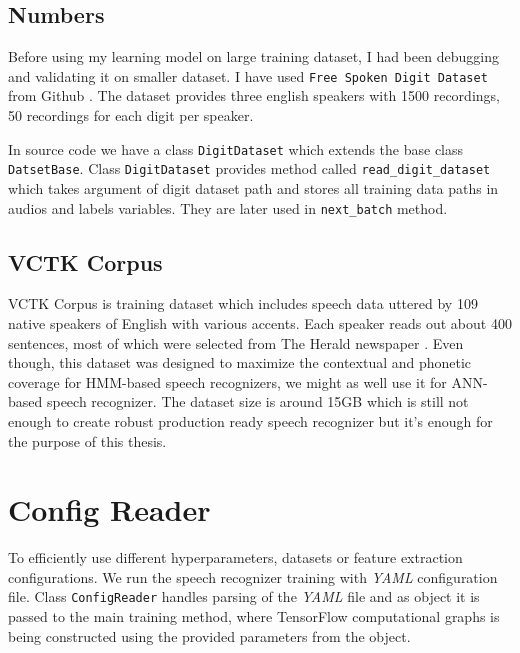 \subsection{Numbers}

Before using my learning model on large training dataset, I had been debugging and validating it on smaller dataset.
I have used \texttt{Free Spoken Digit Dataset} from Github \cite{audio_dataset}.
The dataset provides three english speakers with 1500 recordings, 50 recordings for each digit per speaker.

In source code we have a class \texttt{DigitDataset} which extends the base class \texttt{DatsetBase}.
Class \texttt{DigitDataset} provides method called \texttt{read\_digit\_dataset} which takes argument of digit dataset path and stores all training data paths in audios and labels variables.
They are later used in \texttt{next\_batch} method.

\subsection{VCTK Corpus}

VCTK Corpus is training dataset which includes speech data uttered by 109 native speakers of English with various accents.
Each speaker reads out about 400 sentences, most of which were selected from The Herald newspaper \cite{vctk}.
Even though, this dataset was designed to maximize the contextual and phonetic coverage for HMM-based speech recognizers, we might as well use it for ANN-based speech recognizer.
The dataset size is around 15GB which is still not enough to create robust production ready speech recognizer but it's enough for the purpose of this thesis.

\section{Config Reader}

To efficiently use different hyperparameters, datasets or feature extraction configurations.
We run the speech recognizer training with \textit{YAML} configuration file.
Class \texttt{ConfigReader} handles parsing of the \textit{YAML} file and as object it is passed to the main training method, where TensorFlow computational graphs is being constructed using the provided parameters from the object.



